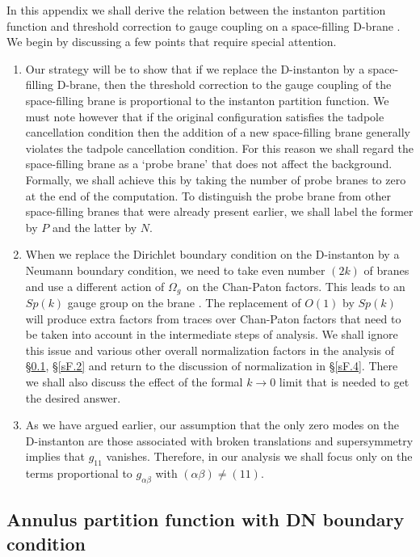 \documentclass[12pt,a4paper]{article}
\newcommand{\oo}{{$\Omega_g$}}
\begin{document}
In this appendix we shall derive the relation between the instanton
partition function and threshold correction to gauge coupling on a space-filling
D-brane \cite{Abel:2006yk,Akerblom:2006hx}. We begin by discussing
a few points  that require special attention.
\begin{enumerate}
\item
Our strategy will be to show that if we replace the D-instanton by a space-filling D-brane,
then the threshold correction to the gauge coupling of the space-filling brane is proportional
to the instanton partition function. We must note however that if the original configuration
satisfies the tadpole cancellation condition then the addition of a new space-filling brane
generally violates the tadpole cancellation condition. For this reason we shall regard the space-filling
brane as a `probe brane' that does not affect the background.
Formally, we shall achieve this by taking the number of probe branes to zero at the end of the computation.
To distinguish the probe brane from other space-filling branes that
were already present earlier, we shall label the former by $P$ and the latter by $N$.

\item
When we replace the Dirichlet boundary condition on the D-instanton by a Neumann
boundary condition, we need to take even number $(2k)$ of branes and use a different action
of \oo\ on the Chan-Paton factors. This leads to an $Sp(k)$ gauge group
on the brane \cite{Gimon:1996rq}. The replacement of $O(1)$ by $Sp(k)$ will produce extra
factors from traces over Chan-Paton factors that need to be taken into account in the
intermediate steps of analysis. We shall ignore this issue and various other overall normalization
factors in the analysis of \S\ref{sF.1}, \S\ref{sF.2} and return to the discussion of normalization
in \S\ref{sF.4}. There we shall also discuss the effect of the formal $k\to 0$ limit that is needed
to get the desired answer.

\item
As we have argued earlier, our assumption that the only zero modes on the D-instanton
are those associated with broken translations and supersymmetry implies that $g_{11}$
vanishes. Therefore, in our analysis we shall  focus only on the terms proportional
to $g_{\alpha\beta}$ with $(\alpha\beta)\ne (11)$.
\end{enumerate}

\subsection{Annulus partition function with DN boundary condition} \label{sF.1}
\end{document}
